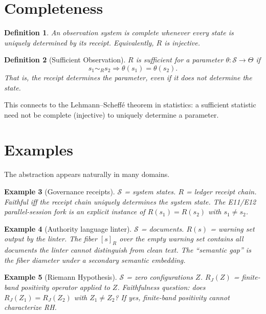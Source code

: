 \documentclass[11pt]{amsart}
\newtheorem{definition}{Definition}[section]
\newtheorem{example}[definition]{Example}
\begin{document}
\section{Completeness}

\begin{definition}
An observation system is complete whenever every state is uniquely determined
by its receipt. Equivalently, $R$ is injective.
\end{definition}

\begin{definition}[Sufficient Observation]
$R$ is sufficient for a parameter $\theta: \mathcal{S} \to \Theta$ if
\[
s_1 \sim_R s_2 \Longrightarrow \theta(s_1) = \theta(s_2).
\]
That is, the receipt determines the parameter, even if it does not
determine the state.
\end{definition}

This connects to the Lehmann--Scheff\'{e} theorem in statistics:
a sufficient statistic need not be complete (injective) to uniquely
determine a parameter.

\section{Examples}

The abstraction appears naturally in many domains.

\begin{example}[Governance receipts]
$\mathcal{S}$ = system states. $R$ = ledger receipt chain.
Faithful iff the receipt chain uniquely determines the system state.
The E11/E12 parallel-session fork is an explicit instance of
$R(s_1) = R(s_2)$ with $s_1 \neq s_2$.
\end{example}

\begin{example}[Authority language linter]
$\mathcal{S}$ = documents. $R(s)$ = warning set output by the linter.
The fiber $[s]_R$ over the empty warning set contains all documents the
linter cannot distinguish from clean text. The ``semantic gap'' is the
fiber diameter under a secondary semantic embedding.
\end{example}

\begin{example}[Riemann Hypothesis]
$\mathcal{S}$ = zero configurations $Z$. $R_J(Z)$ = finite-band positivity
operator applied to $Z$. Faithfulness question: does $R_J(Z_1) = R_J(Z_2)$
with $Z_1 \neq Z_2$? If yes, finite-band positivity cannot characterize RH.
\end{example}
\end{document}
